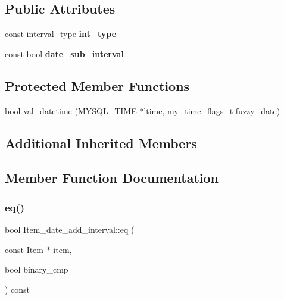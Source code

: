 \subsection*{Public Attributes}
\begin{DoxyCompactItemize}
\item 
\mbox{\label{classItem__date__add__interval_ae4cac2ba36c298f2aaead432b05fafd2}} 
const interval\+\_\+type {\bfseries int\+\_\+type}
\item 
\mbox{\label{classItem__date__add__interval_ac896082897a326d6cad6614decbc4873}} 
const bool {\bfseries date\+\_\+sub\+\_\+interval}
\end{DoxyCompactItemize}
\subsection*{Protected Member Functions}
\begin{DoxyCompactItemize}
\item 
bool \mbox{\hyperlink{classItem__date__add__interval_a9e08d81e94f966689f64eed696fc5a83}{val\+\_\+datetime}} (M\+Y\+S\+Q\+L\+\_\+\+T\+I\+ME $\ast$ltime, my\+\_\+time\+\_\+flags\+\_\+t fuzzy\+\_\+date)
\end{DoxyCompactItemize}
\subsection*{Additional Inherited Members}


\subsection{Member Function Documentation}
\mbox{\label{classItem__date__add__interval_a1f23c39581583b37f1694f987655b772}} 
\subsubsection{\texorpdfstring{eq()}{eq()}}
{\footnotesize\ttfamily bool Item\+\_\+date\+\_\+add\+\_\+interval\+::eq (\begin{DoxyParamCaption}\item[{const \mbox{\hyperlink{classItem}{Item}} $\ast$}]{item,  }\item[{bool}]{binary\+\_\+cmp }\end{DoxyParamCaption}) const\hspace{0.3cm}{\ttfamily [virtual]}}

